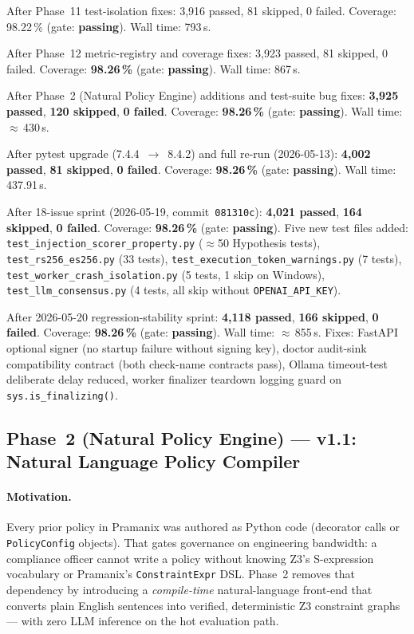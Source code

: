 \documentclass[12pt,a4paper,oneside]{report}
\newcommand{\fname}[1]{\texttt{#1}}          %
\newcommand{\code}[1]{\texttt{#1}}           %
\begin{document}
After Phase~11 test-isolation fixes: 3,916 passed, 81 skipped, 0 failed.
Coverage: 98.22\,\% (gate: \textbf{passing}).  Wall time: 793\,s.

After Phase~12 metric-registry and coverage fixes: 3,923 passed, 81 skipped,
0 failed.  Coverage: \textbf{98.26\,\%} (gate: \textbf{passing}).  Wall
time: 867\,s.

After Phase~2 (Natural Policy Engine) additions and test-suite bug fixes:
\textbf{3,925 passed}, \textbf{120 skipped}, \textbf{0 failed}.  Coverage:
\textbf{98.26\,\%} (gate: \textbf{passing}).  Wall time: $\approx$\,430\,s.

After pytest upgrade (7.4.4~$\to$~8.4.2) and full re-run (2026-05-13):
\textbf{4,002 passed}, \textbf{81 skipped}, \textbf{0 failed}.  Coverage:
\textbf{98.26\,\%} (gate: \textbf{passing}).  Wall time: 437.91\,s.

After 18-issue sprint (2026-05-19, commit~\code{081310c}):
\textbf{4,021 passed}, \textbf{164 skipped}, \textbf{0 failed}.  Coverage:
\textbf{98.26\,\%} (gate: \textbf{passing}).  Five new test files added:
\fname{test\_injection\_scorer\_property.py} ($\approx$50 Hypothesis tests),
\fname{test\_rs256\_es256.py} (33 tests), \fname{test\_execution\_token\_warnings.py}
(7 tests), \fname{test\_worker\_crash\_isolation.py} (5 tests, 1 skip on
Windows), \fname{test\_llm\_consensus.py} (4 tests, all skip without
\code{OPENAI\_API\_KEY}).

After 2026-05-20 regression-stability sprint:
\textbf{4,118 passed}, \textbf{166 skipped}, \textbf{0 failed}.  Coverage:
\textbf{98.26\,\%} (gate: \textbf{passing}).  Wall time: $\approx$\,855\,s.
Fixes: FastAPI optional signer (no startup failure without signing key),
doctor audit-sink compatibility contract (both check-name contracts pass),
Ollama timeout-test deliberate delay reduced, worker finalizer teardown
logging guard on \code{sys.is\_finalizing()}.

\subsection*{Phase~2 (Natural Policy Engine) --- v1.1: Natural Language Policy Compiler}

\paragraph{Motivation.}
Every prior policy in Pramanix was authored as Python code (decorator calls or
\code{PolicyConfig} objects).  That gates governance on engineering bandwidth:
a compliance officer cannot write a policy without knowing Z3's S-expression
vocabulary or Pramanix's \code{ConstraintExpr} DSL.  Phase~2 removes that
dependency by introducing a \emph{compile-time} natural-language front-end
that converts plain English sentences into verified, deterministic Z3
constraint graphs — with zero LLM inference on the hot evaluation path.
\end{document}
